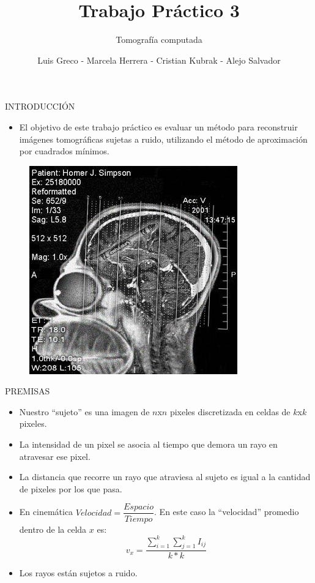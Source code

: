 \documentclass[11pt]{beamer}
\author{Luis Greco - Marcela Herrera - Cristian Kubrak - Alejo Salvador }
\title{Trabajo Práctico 3}
\subtitle{Tomografía computada}
\begin{document}
\begin{frame}
\titlepage 
\end{frame}


\begin{frame}{INTRODUCCIÓN}
\begin{itemize}
\item El objetivo de este trabajo práctico es evaluar un método para reconstruir imágenes tomográficas sujetas a ruido, utilizando el método de aproximación por cuadrados mínimos.
\end{itemize}
\begin{figure}[H]
    \centering
    \includegraphics[scale=0.4]{img/photo_2018-07-05_14-34-53.jpg}
    \label{fig:homero}
\end{figure}
\end{frame}

\begin{frame}{PREMISAS}
\begin{itemize}
\item Nuestro “sujeto” es una imagen de $n$x$n$ pixeles discretizada en celdas de $k$x$k$ pixeles.
\item La intensidad de un pixel se asocia al tiempo que demora un rayo en atravesar ese pixel.
\item La distancia que recorre un rayo que atraviesa al sujeto es igual a la cantidad de pixeles por los que pasa.
\item En cinemática $Velocidad = \dfrac{Espacio}{Tiempo}$. En este caso la “velocidad” promedio dentro de la celda $x$ es:
\begin{displaymath}
v_{x} =\dfrac{\sum_{i=1}^{k}\sum_{j=1}^{k} I_{ij}}{k*k}
\end{displaymath}
\item Los rayos están sujetos a ruido.
\end{itemize}
\end{frame}
\end{document}
